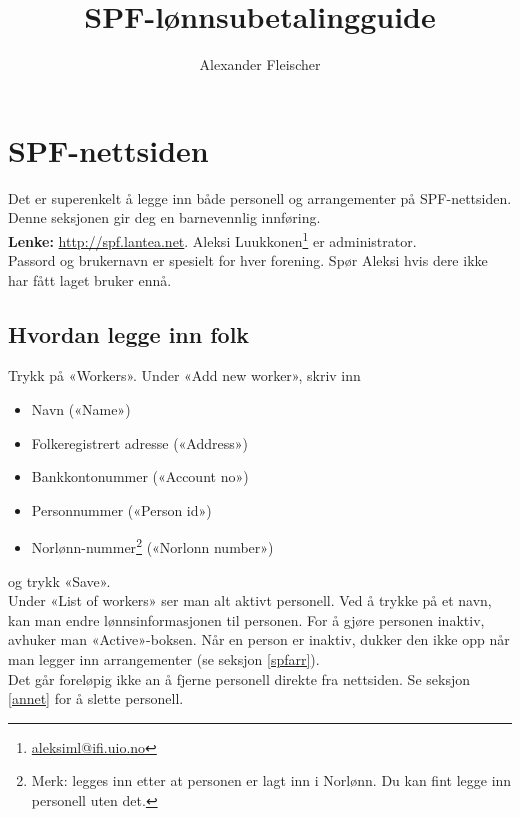 \documentclass[12pt,norsk]{article}
\begin{document}
\title{SPF-lønnsubetalingguide}
\author{Alexander Fleischer}
\maketitle

\section{SPF-nettsiden}
\label{spf}

Det er superenkelt å legge inn både personell og arrangementer
på SPF-nettsiden. Denne seksjonen gir deg en barnevennlig
innføring.\\

\noindent \textbf{Lenke:} \url{http://spf.lantea.net}.
Aleksi 
Luukkonen\footnote{\href{mailto:aleksiml@ifi.uio.no}{aleksiml@ifi.uio.no}} 
er administrator.\\

\noindent Passord og brukernavn er spesielt for hver forening.
Spør Aleksi hvis dere ikke har fått laget bruker ennå.

\subsection{Hvordan legge inn folk}
\label{spflonn}

Trykk på «Workers». 
Under «Add new worker», skriv inn
\begin{itemize}
  \item Navn («Name»)
  \item Folkeregistrert adresse («Address»)
  \item Bankkontonummer («Account no»)
  \item Personnummer («Person id»)
  \item Norlønn-nummer\footnote{Merk: legges inn etter
    at personen er lagt inn i Norlønn. Du kan fint
    legge inn personell uten det.}
    («Norlonn number»)
\end{itemize}
og trykk «Save».\\

\noindent Under «List of workers» ser man alt aktivt personell.
Ved å trykke på et navn, kan man endre lønnsinformasjonen
til personen.
For å gjøre personen inaktiv, avhuker man «Active»-boksen.
Når en person er inaktiv, dukker den ikke opp når man
legger inn arrangementer (se seksjon \ref{spfarr}).\\

\noindent Det går foreløpig ikke an å fjerne 
personell direkte fra nettsiden.
Se seksjon \ref{annet} for å slette personell.
\end{document}
